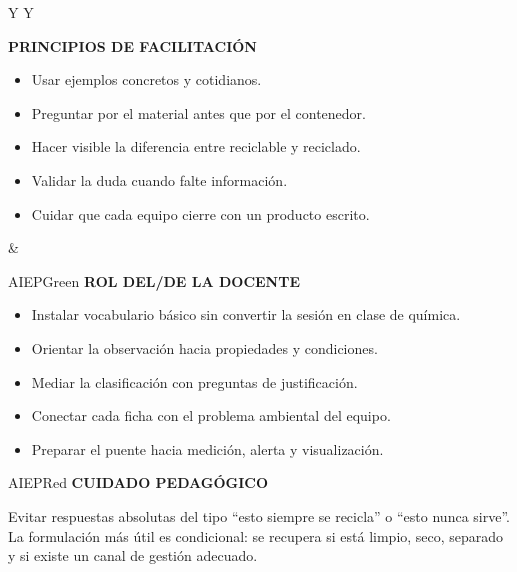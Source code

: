 ﻿\documentclass[10pt,a4paper]{article}
\newcommand{\labeltext}[1]{%
  {\scriptsize\bfseries\color{AIEPSlate}\MakeUppercase{#1}}\par\vspace{1.3mm}
}
\begin{document}
\begin{tabularx}{\textwidth}{Y Y}
\begin{card}[height=62mm,valign=top]
\labeltext{Principios de facilitación}
\begin{itemize}
  \item Usar ejemplos concretos y cotidianos.
  \item Preguntar por el material antes que por el contenedor.
  \item Hacer visible la diferencia entre reciclable y reciclado.
  \item Validar la duda cuando falte información.
  \item Cuidar que cada equipo cierre con un producto escrito.
\end{itemize}
\end{card}
&
\begin{softcard}[height=62mm,valign=top]{AIEPGreen}
\labeltext{Rol del/de la docente}
\begin{itemize}
  \item Instalar vocabulario básico sin convertir la sesión en clase de química.
  \item Orientar la observación hacia propiedades y condiciones.
  \item Mediar la clasificación con preguntas de justificación.
  \item Conectar cada ficha con el problema ambiental del equipo.
  \item Preparar el puente hacia medición, alerta y visualización.
\end{itemize}
\end{softcard}
\end{tabularx}

\vspace{4mm}
\begin{softcard}{AIEPRed}
\labeltext{Cuidado pedagógico}
Evitar respuestas absolutas del tipo ``esto siempre se recicla'' o ``esto nunca sirve''. La formulación más útil es condicional: se recupera si está limpio, seco, separado y si existe un canal de gestión adecuado.
\end{softcard}

\vspace{4mm}
\end{document}
